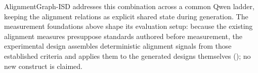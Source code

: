 AlignmentGraph-ISD addresses this combination across a common Qwen ladder,
keeping the alignment relations as explicit shared state during generation. The
measurement foundations above shape its evaluation setup: because the existing
alignment measures presuppose standards authored before measurement, the
experimental design assembles deterministic alignment signals from those established
criteria and applies them to the generated designs themselves
(); no new construct is claimed.
